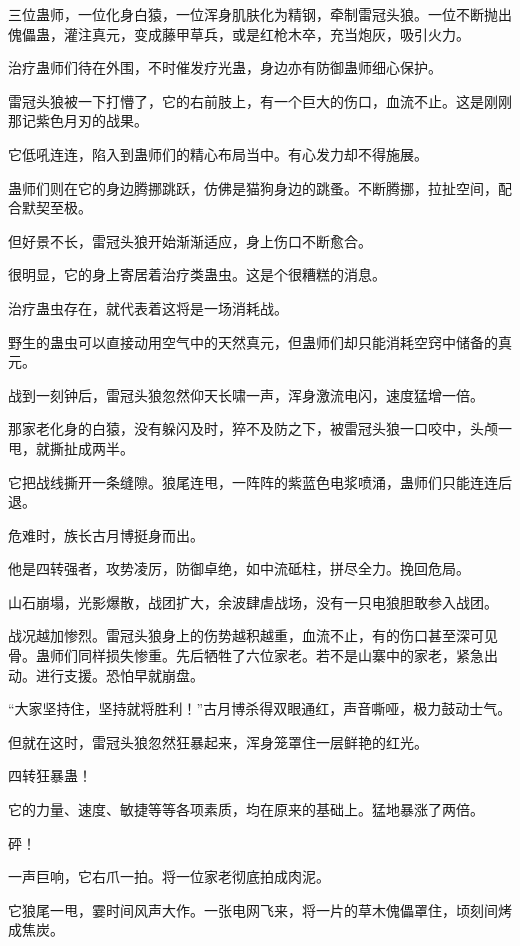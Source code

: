 \begin{this_body}
三位蛊师，一位化身白猿，一位浑身肌肤化为精钢，牵制雷冠头狼。一位不断抛出傀儡蛊，灌注真元，变成藤甲草兵，或是红枪木卒，充当炮灰，吸引火力。

治疗蛊师们待在外围，不时催发疗光蛊，身边亦有防御蛊师细心保护。

雷冠头狼被一下打懵了，它的右前肢上，有一个巨大的伤口，血流不止。这是刚刚那记紫色月刃的战果。

它低吼连连，陷入到蛊师们的精心布局当中。有心发力却不得施展。

蛊师们则在它的身边腾挪跳跃，仿佛是猫狗身边的跳蚤。不断腾挪，拉扯空间，配合默契至极。

但好景不长，雷冠头狼开始渐渐适应，身上伤口不断愈合。

很明显，它的身上寄居着治疗类蛊虫。这是个很糟糕的消息。

治疗蛊虫存在，就代表着这将是一场消耗战。

野生的蛊虫可以直接动用空气中的天然真元，但蛊师们却只能消耗空窍中储备的真元。

战到一刻钟后，雷冠头狼忽然仰天长啸一声，浑身激流电闪，速度猛增一倍。

那家老化身的白猿，没有躲闪及时，猝不及防之下，被雷冠头狼一口咬中，头颅一甩，就撕扯成两半。

它把战线撕开一条缝隙。狼尾连甩，一阵阵的紫蓝色电浆喷涌，蛊师们只能连连后退。

危难时，族长古月博挺身而出。

他是四转强者，攻势凌厉，防御卓绝，如中流砥柱，拼尽全力。挽回危局。

山石崩塌，光影爆散，战团扩大，余波肆虐战场，没有一只电狼胆敢参入战团。

战况越加惨烈。雷冠头狼身上的伤势越积越重，血流不止，有的伤口甚至深可见骨。蛊师们同样损失惨重。先后牺牲了六位家老。若不是山寨中的家老，紧急出动。进行支援。恐怕早就崩盘。

“大家坚持住，坚持就将胜利！”古月博杀得双眼通红，声音嘶哑，极力鼓动士气。

但就在这时，雷冠头狼忽然狂暴起来，浑身笼罩住一层鲜艳的红光。

四转狂暴蛊！

它的力量、速度、敏捷等等各项素质，均在原来的基础上。猛地暴涨了两倍。

砰！

一声巨响，它右爪一拍。将一位家老彻底拍成肉泥。

它狼尾一甩，霎时间风声大作。一张电网飞来，将一片的草木傀儡罩住，顷刻间烤成焦炭。


\end{this_body}
